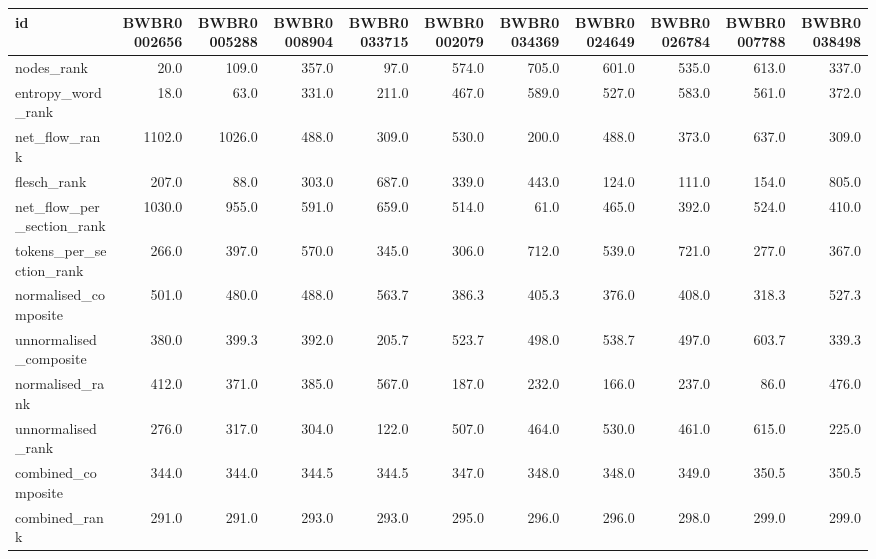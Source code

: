 \begin{tabular}{lrrrrrrrrrr}
\toprule
id & BWBR0002656 & BWBR0005288 & BWBR0008904 & BWBR0033715 & BWBR0002079 & BWBR0034369 & BWBR0024649 & BWBR0026784 & BWBR0007788 & BWBR0038498 \\
\midrule
nodes\_rank & 20.0 & 109.0 & 357.0 & 97.0 & 574.0 & 705.0 & 601.0 & 535.0 & 613.0 & 337.0 \\
\cline{1-11}
entropy\_word\_rank & 18.0 & 63.0 & 331.0 & 211.0 & 467.0 & 589.0 & 527.0 & 583.0 & 561.0 & 372.0 \\
\cline{1-11}
net\_flow\_rank & 1102.0 & 1026.0 & 488.0 & 309.0 & 530.0 & 200.0 & 488.0 & 373.0 & 637.0 & 309.0 \\
\cline{1-11}
flesch\_rank & 207.0 & 88.0 & 303.0 & 687.0 & 339.0 & 443.0 & 124.0 & 111.0 & 154.0 & 805.0 \\
\cline{1-11}
net\_flow\_per\_section\_rank & 1030.0 & 955.0 & 591.0 & 659.0 & 514.0 & 61.0 & 465.0 & 392.0 & 524.0 & 410.0 \\
\cline{1-11}
tokens\_per\_section\_rank & 266.0 & 397.0 & 570.0 & 345.0 & 306.0 & 712.0 & 539.0 & 721.0 & 277.0 & 367.0 \\
\cline{1-11}
normalised\_composite & 501.0 & 480.0 & 488.0 & 563.7 & 386.3 & 405.3 & 376.0 & 408.0 & 318.3 & 527.3 \\
\cline{1-11}
unnormalised\_composite & 380.0 & 399.3 & 392.0 & 205.7 & 523.7 & 498.0 & 538.7 & 497.0 & 603.7 & 339.3 \\
\cline{1-11}
normalised\_rank & 412.0 & 371.0 & 385.0 & 567.0 & 187.0 & 232.0 & 166.0 & 237.0 & 86.0 & 476.0 \\
\cline{1-11}
unnormalised\_rank & 276.0 & 317.0 & 304.0 & 122.0 & 507.0 & 464.0 & 530.0 & 461.0 & 615.0 & 225.0 \\
\cline{1-11}
combined\_composite & 344.0 & 344.0 & 344.5 & 344.5 & 347.0 & 348.0 & 348.0 & 349.0 & 350.5 & 350.5 \\
\cline{1-11}
combined\_rank & 291.0 & 291.0 & 293.0 & 293.0 & 295.0 & 296.0 & 296.0 & 298.0 & 299.0 & 299.0 \\
\cline{1-11}
\bottomrule
\end{tabular}

